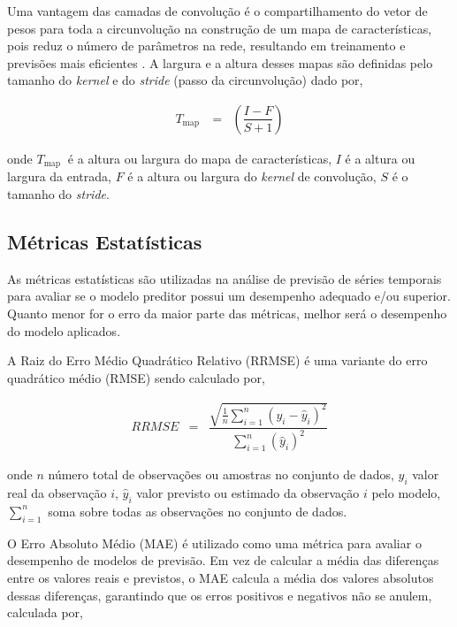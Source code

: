 Uma vantagem das camadas de convolução é o compartilhamento do vetor de pesos para toda a circunvolução na construção de um mapa de características, pois reduz o número de parâmetros na rede, resultando em treinamento e previsões mais eficientes \cite{lucas_2019}.
A largura e a altura desses mapas são definidas pelo tamanho do \textit{kernel} e do \textit{stride} (passo da circunvolução) dado por,
 
 \begin{eqnarray}
 	T_{\text {map }}&=&\left(\dfrac{I-F}{S+1}\right)\label{cnn1}
 \end{eqnarray}
 
 \noindent onde
 $T_{\text {map }}$ é a altura ou largura do mapa de características,
 $I$ é a altura ou largura da entrada,
 $F$ é a altura ou largura do \textit{kernel} de convolução,
 $S$ é o tamanho do \textit{stride}.
 
 \subsection{M\'etricas Estat\'isticas}\label{subsec:metrica}
 
As métricas estatísticas são utilizadas na análise de previsão de séries temporais para avaliar se o modelo preditor possui um desempenho adequado e/ou superior. Quanto menor for o erro da maior parte das métricas, melhor será o desempenho do modelo aplicados.
 
A Raiz do Erro Médio Quadrático Relativo (RRMSE) é uma variante do erro quadrático médio (RMSE) sendo calculado por,
 
 \begin{eqnarray}
 	R R M S E&=&\dfrac{\sqrt{\frac{1}{n} \sum_{i=1}^n\left(y_i-\hat{y}_i\right)^2}}{\sum_{i=1}^n\left(\hat{y}_i\right)^2}
 \end{eqnarray}
 
 \noindent onde \(n\) número total de observações ou amostras no conjunto de dados,
 \(y_i\) valor real da observação \(i\),
 \(\hat{y}_i\) valor previsto ou estimado da observação \(i\) pelo modelo,
 \(\sum_{i=1}^{n}\) soma sobre todas as observações no conjunto de dados.
 
O Erro Absoluto Médio (MAE) é utilizado como uma métrica para avaliar o desempenho de modelos de previsão. Em vez de calcular a média das diferenças entre os valores reais e previstos, o MAE calcula a média dos valores absolutos dessas diferenças, garantindo que os erros positivos e negativos não se anulem, calculada por,
 

